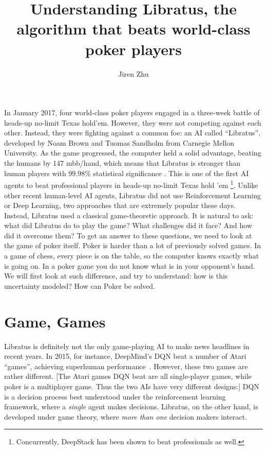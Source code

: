 \documentclass[10pt,a4paper]{article}
\author{Jiren Zhu}
\title{Understanding Libratus, the algorithm that beats world-class poker players}
\begin{document}
\maketitle

In January 2017, four world-class poker players engaged in a three-week battle of heads-up no-limit Texas hold'em. However, they were not competing against each other. Instead, they were fighting against a common foe: an AI called ``Libratus'', developed by Noam Brown and Tuomas Sandholm from Carnegie Mellon University. As the game progressed, the computer held a solid advantage, beating the humans by 147 mbb/hand, which means that Libratus is stronger than human players with $99.98\%$ statistical significance \cite{brown2017superhuman}.  This is one of the first AI agents to beat professional players in heads-up no-limit Texas hold 'em \footnote{Concurrently, DeepStack \cite{moravvcik2017deepstack} has been shown to beat professionals as well.}.  Unlike other recent human-level AI agents, Libratus did not use Reinforcement Learning or Deep Learning, two approaches that are extremely popular these days. Instead, Libratus used a classical game-theoretic approach. It is natural to ask: what did Libratus do to play the game? What challenges did it face? And how did it overcome them? To get an answer to these questions, we need to look at the game of poker itself. Poker is harder than a lot of previously solved games. In a game of chess, every piece is on the table, so the computer knows exactly what is going on. In a poker game you do not know what is in your opponent's hand. We will first look at such difference, and try to understand: how is this uncertainty modeled? How can Poker be solved. 

\section{Game, Games}
Libratus is definitely not the only game-playing AI to make news headlines in recent years. In 2015, for instance, DeepMind's DQN beat a number of Atari ``games'', achieving superhuman performance~\cite{mnih2015human}. However, these two games are rather different. [The Atari games DQN beat are all single-player games, while poker is a multiplayer game. Thus the two AIs have very different designs:] DQN is a decision process best understood under the reinforcement learning framework, where a \textit{single} agent makes decisions. Libratus, on the other hand, is developed under game theory, where \textit{more than one} decision makers interact. 
\end{document}
